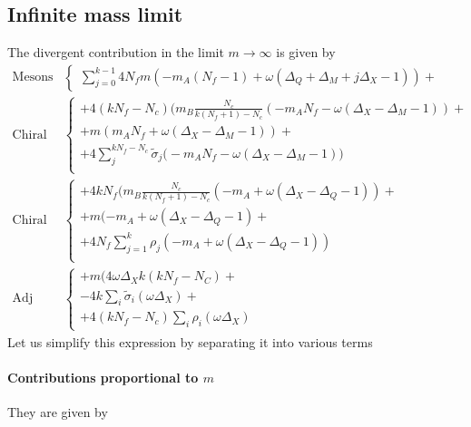 \begin{appendices}
\section{Infinite mass limit}
The divergent contribution in the limit $m \rightarrow \infty$ is given by
\begin{equation}
\begin{aligned}
\mbox{Mesons}  &\begin{cases}
\sum_{j=0}^{k-1} 4 N_f   m (- m_A (N_f - 1)  + \omega( \Delta_Q +  \Delta_M + j \Delta_X -1  )  ) +
\end{cases}
\\
\mbox{Chiral 1}& \begin{cases}
+  4 ( k N_f - N_c ) \big(  m_B  \frac{N_c}{k (N_f+1) - N_c} (  -  m_A N_f - \omega( \Delta_X - \Delta_M - 1)) +\\
 +  m ( m_A N_f + \omega( \Delta_X - \Delta_M - 1)) + \\
   +  4 \sum_j^{k N_f - N_c} \tilde{\sigma}_j \big( - m_A N_f -  \omega( \Delta_X - \Delta_M - 1) \big) \\
\end{cases}\\
\mbox{Chiral 2} & \begin{cases}
  +    4 k N_f \big(  m_B \frac{N_c}{k (N_f+1) - N_c} (- m_A +  \omega ( \Delta_X - \Delta_Q - 1)) + \\
  +  m ( - m_A +  \omega ( \Delta_X - \Delta_Q - 1)+ \\
+  4 N_f \sum_{j=1}^k  \rho_j ( - m_A +  \omega ( \Delta_X - \Delta_Q - 1) ) \\
\end{cases}\\
\mbox{Adj matter} & \begin{cases}
	+ m( 4 \omega \Delta_X k ( k N_f - N_C) +\\
	- 4 k \sum_i \tilde{\sigma}_i (  \omega \Delta_X ) + \\
	+ 4 (k N_f - N_c)  \sum_i \rho_i(  \omega \Delta_X )
\end{cases}
\end{aligned}
\end{equation}
Let us simplify this expression by separating it into various terms
\paragraph{Contributions proportional to $m$}
They are given by



\end{appendices}
